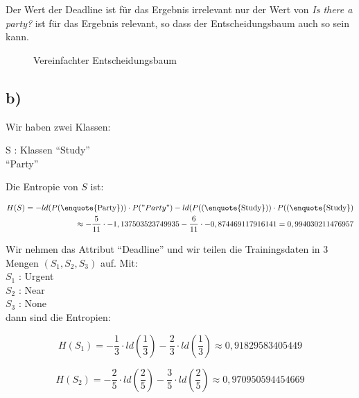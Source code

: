 \documentclass[a4paper,parskip=full-]{article}
\begin{document}
Der Wert der Deadline ist für das Ergebnis irrelevant nur der Wert von \textit{Is there a party?} ist für das Ergebnis relevant, so dass der 
Entscheidungsbaum auch so sein kann.


\begin{figure}[H]
\caption{Vereinfachter Entscheidungsbaum}
\label{fig:3a2}
\end{figure}

\subsection{b)}

Wir haben zwei Klassen:

\begin{tabbing} 
S : Klassen \= \enquote{Study} \\
\> \enquote{Party}
\end{tabbing}

Die Entropie von $S$ ist:

\begin{equation*}
\begin{split}
H(S) = -ld (P(\text{\enquote{Party}})) \cdot P("Party") - ld (P((\text{\enquote{Study}})) \cdot P((\text{\enquote{Study}}) \\
\approx -\frac{5}{11} \cdot -1,137503523749935
   -\frac{6}{11} \cdot -0,874469117916141 
= 0,994030211476957
\end{split}
\end{equation*}

Wir nehmen das Attribut \enquote{Deadline} und wir teilen die Trainingsdaten in 3 Mengen $(S_1,S_2,S_3)$ auf.
Mit: \\
$S_1$ : Urgent \\
$S_2$ : Near \\
$S_3$ : None \\
dann sind die Entropien:  

$$H(S_1) = -\frac{1}{3} \cdot ld \left(\frac{1}{3} \right) - \frac{2}{3} \cdot ld \left(\frac{1}{3} \right) \approx 0,91829583405449 
$$
 
$$
H(S_2) = -\frac{2}{5} \cdot ld \left(\frac{2}{5} \right) - \frac{3}{5} \cdot ld \left(\frac{2}{5} \right) \approx 0,970950594454669 
$$
 
\end{document}
